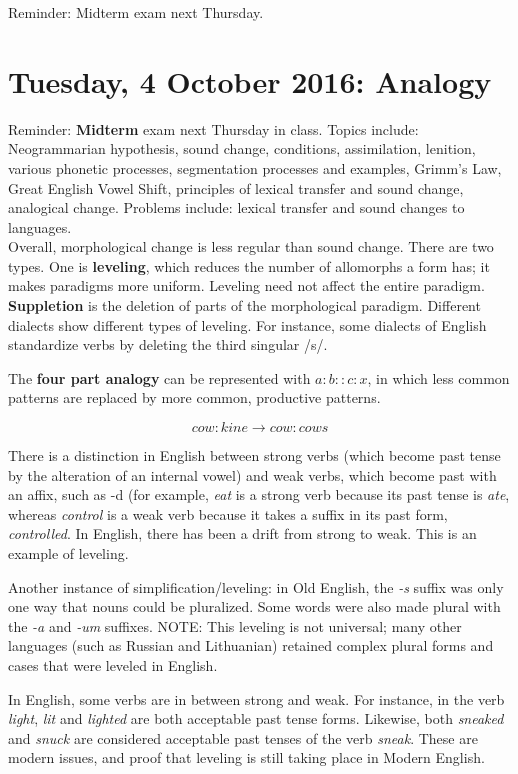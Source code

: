 \documentclass{exam}
\begin{document}
Reminder: Midterm exam next Thursday. 

\section*{Tuesday, 4 October 2016: Analogy}

Reminder: \textbf{Midterm} exam next Thursday in class. Topics include: Neogrammarian hypothesis, sound change, conditions, assimilation, lenition, various phonetic processes, segmentation processes and examples, Grimm's Law, Great English Vowel Shift, principles of lexical transfer and sound change, analogical change. Problems include: lexical transfer and sound changes to languages.\\

Overall, morphological change is less regular than sound change. There are two types. One is \textbf{leveling}, which reduces the number of allomorphs a form has; it makes paradigms more uniform. Leveling need not affect the entire paradigm. \textbf{Suppletion} is the deletion of parts of the morphological paradigm. Different dialects show different types of leveling. For instance, some dialects of English standardize verbs by deleting the third singular /s/. 

The \textbf{four part analogy} can be represented with $a:b::c:x$, in which less common patterns are replaced by more common, productive patterns. 

$$cow:kine \rightarrow cow:cows$$

There is a distinction in English between strong verbs (which become past tense by the alteration of an internal vowel) and weak verbs, which become past with an affix, such as -d (for example, \textit{eat} is a strong verb because its past tense is \textit{ate}, whereas \textit{control} is a weak verb because it takes a suffix in its past form, \textit{controlled}. In English, there has been a drift from strong to weak. This is an example of leveling. 

Another instance of simplification/leveling: in Old English, the \textit{-s} suffix was only one way that nouns could be pluralized. 
Some words were also made plural with the \textit{-a} and \textit{-um} suffixes. NOTE: This leveling is not universal; many other languages (such as Russian and Lithuanian) retained complex plural forms and cases that were leveled in English.

In English, some verbs are in between strong and weak. For instance, in the verb \textit{light}, \textit{lit} and \textit{lighted} are both acceptable past tense forms. Likewise, both \textit{sneaked} and \textit{snuck} are considered acceptable past tenses of the verb \textit{sneak}. These are modern issues, and proof that leveling is still taking place in Modern English. 
\end{document}
